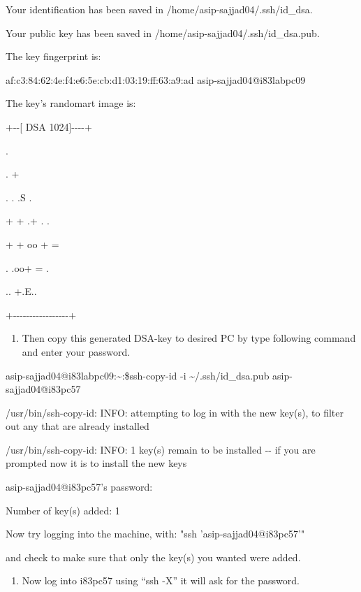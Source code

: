 \documentclass{article}
\begin{document}
Your identification has been saved in /home/asip-sajjad04/.ssh/id\_dsa.

Your public key has been saved in /home/asip-sajjad04/.ssh/id\_dsa.pub.

The key fingerprint is:

af:c3:84:62:4e:f4:e6:5e:cb:d1:03:19:ff:63:a9:ad asip-sajjad04@i83labpc09

The key's randomart image is:

+-\/-{[} DSA 1024{]}-\/-\/-\/-+

\textbar{} \textbar{}

\textbar{} \textbar{}

\textbar{} . \textbar{}

\textbar{} . + \textbar{}

\textbar{} . . .S . \textbar{}

\textbar{} + + .+ . . \textbar{}

\textbar{} + + oo + = \textbar{}

\textbar{} . .oo+ = . \textbar{}

\textbar{} .. +.E.. \textbar{}

+-\/-\/-\/-\/-\/-\/-\/-\/-\/-\/-\/-\/-\/-\/-\/-\/-+

\begin{enumerate}
\def\labelenumi{\arabic{enumi}.}
\setcounter{enumi}{10}
\item
  Then copy this generated DSA-key to desired PC by type following
  command and enter your password.
\end{enumerate}

asip-sajjad04@i83labpc09:\textasciitilde:\$ssh-copy-id -i
\textasciitilde/.ssh/id\_dsa.pub asip-sajjad04@i83pc57

/usr/bin/ssh-copy-id: INFO: attempting to log in with the new key(s), to
filter out any that are already installed

/usr/bin/ssh-copy-id: INFO: 1 key(s) remain to be installed -\/- if you
are prompted now it is to install the new keys

asip-sajjad04@i83pc57's password:

Number of key(s) added: 1

Now try logging into the machine, with: "ssh 'asip-sajjad04@i83pc57'"

and check to make sure that only the key(s) you wanted were added.

\begin{enumerate}
\def\labelenumi{\arabic{enumi}.}
\setcounter{enumi}{11}
\item
  Now log into i83pc57 using ``ssh -X'' it will ask for the password.
\end{enumerate}
\end{document}

